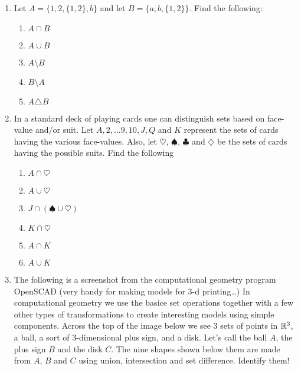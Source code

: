 \begin{enumerate}
\item Let $A = \{1, 2, \{1, 2\}, b\}$ and let $B=\{a, b, \{1, 2\} \}$.
Find the following:
  \begin{enumerate}
  \item \wbitemsep $A \cap B$   
  \item \wbitemsep $A \cup B$ 
  \item \wbitemsep $A \setminus B$ 
  \item \wbitemsep $B \setminus A$ 
  \item \wbitemsep $A \triangle B$ 
  \end{enumerate}

\vfill


\workbookpagebreak

\item In a standard deck of playing cards one can distinguish sets
based on face-value and/or suit.  Let $A, 2, \ldots 9, 10, J, Q$ and $K$
represent the sets of cards having the various face-values.  Also, let
$\heartsuit$, $\spadesuit$, $\clubsuit$ and $\diamondsuit$ be the 
sets of cards having the possible suits.  Find the following
  \begin{enumerate}
  \item \wbitemsep$A \cap \heartsuit$ 
  \item \wbitemsep$A \cup \heartsuit$ 
  \item \wbitemsep$J \cap (\spadesuit \cup \heartsuit)$ 
  \item \wbitemsep$K \cap \heartsuit$ 
  \item \wbitemsep$A \cap K$ \hint{$\emptyset$ }
  \item \wbitemsep$A \cup K$ 
  \end{enumerate}

\vfill


\pagebreak

\item The following is a screenshot from the computational geometry program OpenSCAD (very handy for making models for 3-d printing\ldots)  In computational geometry we use the basice set operations together
with a few other types of transformations to create interesting models using simple components.  Across the top of the image below we see 3 sets of points in ${\mathbb R}^3$, a ball, a sort of 3-dimensional plus sign, and a disk.  Let's call the ball $A$, the plus sign $B$ and the disk $C$.   The nine shapes shown below them are made from $A$, $B$ and $C$ using union, intersection and set difference.  Identify them!


\end{enumerate}
